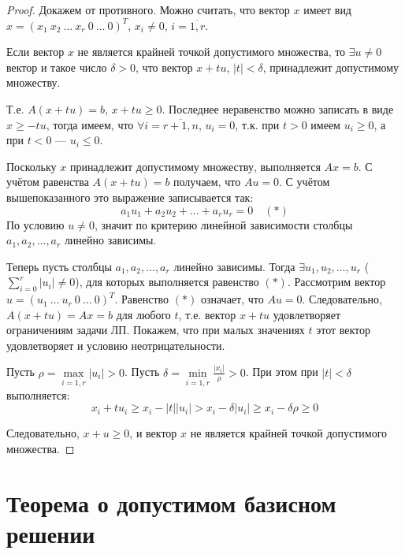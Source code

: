 \documentclass[17pt]{extarticle}
\begin{document}
\begin{proof}
    Докажем от противного. Можно считать, что вектор \( x \) имеет вид
    \( x = (x_1 \ x_2 \ \dots \ x_r \ 0 \ \dots \ 0)^T \), \( x_i \ne 0 \), \( i = \overline{1,r} \).

    Если вектор \( x \) не является крайней точкой допустимого множества,
    то \( \exists u \ne 0 \) вектор и такое число \( \delta > 0 \), что вектор \( x + tu \), \( |t| < \delta \),
    принадлежит допустимому множеству.

    Т.е. \( A(x + tu) = b \), \( x + tu \ge 0 \). Последнее неравенство можно записать в виде \( x \ge -tu \),
    тогда имеем, что \( \forall i = \overline{r+1, n} \), \( u_i = 0 \), т.к. при \( t > 0 \) имеем \( u_i \ge 0 \),
    а при \( t < 0 \) — \( u_i \le 0 \).

    Поскольку \( x \) принадлежит допустимому множеству, выполняется \( Ax = b \).
    С учётом равенства \( A(x + tu) = b \) получаем, что \( Au = 0 \). С учётом вышепоказанного это выражение записывается так:
    \[
        a_1u_1 + a_2u_2 + \dots + a_ru_r = 0 \quad (*)
    \]
    По условию \( u \ne 0 \), значит по критерию линейной зависимости столбцы \( a_1, a_2, \dots, a_r \) линейно зависимы.

    Теперь пусть столбцы \( a_1, a_2, \dots, a_r \) линейно зависимы.
    Тогда \( \exists u_1, u_2, \dots, u_r \) (\( \sum\limits_{i=0}^r |u_i| \ne 0 \)),
    для которых выполняется равенство \( (*) \). Рассмотрим вектор \( u = (u_1 \ \dots \ u_r \ 0 \ \dots \ 0)^T \).
    Равенство \( (*) \) означает, что \( Au = 0 \). Следовательно, \( A(x + tu) = Ax = b \) для любого \( t \),
    т.е. вектор \( x + tu \) удовлетворяет ограничениям задачи ЛП.
    Покажем, что при малых значениях \( t \) этот вектор удовлетворяет и условию неотрицательности.

    Пусть \( \rho = \max\limits_{i = \overline{1,r}} |u_i| > 0 \). Пусть \( \delta = \min\limits_{i = \overline{1,r}} \frac{|x_i|}{\rho} > 0 \).
    При этом при \( |t| < \delta \) выполняется:
    \[
        x_i + tu_i \ge x_i - |t||u_i| > x_i - \delta|u_i| \ge x_i - \delta\rho \ge 0
    \]

    Следовательно, \( x + u \ge 0 \), и вектор \( x \) не является крайней точкой допустимого множества.
\end{proof}




\section{Теорема о допустимом базисном решении}
\end{document}
